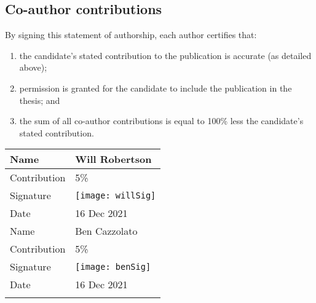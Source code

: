 \vfill
    
\subsection*{Co-author contributions}
By signing this statement of authorship, each author certifies that:
\begin{enumerate}
    \item the candidate's stated contribution to the publication is accurate (as detailed above);
    \item permission is granted for the candidate to include the publication in the thesis; and
    \item the sum of all co-author contributions is equal to 100\% less the candidate's stated contribution.
\end{enumerate}
\begin{tabular}{m{} m{}}
    \hline \hline Name & Will Robertson \\ \hline
    Contribution & 5\% \\ \hline
    Signature & \vspace{2mm}\texttt{[image: willSig]} \\  \hline
    Date & 16 Dec 2021 \\
    \hline \hline Name & Ben Cazzolato \\ \hline
    Contribution & 5\% \\ \hline
    Signature & \vspace{2mm} \texttt{[image: benSig]} \\ \hline
    Date & 16 Dec 2021 \\
    \hline \hline \vfill
\end{tabular}
\renewcommand{\arraystretch}{1}
\newpage